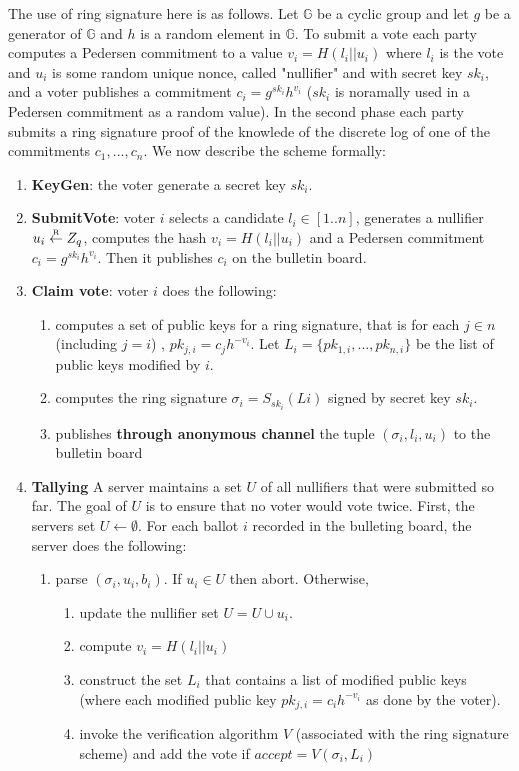 \documentclass[]{article}
\newcommand\getr{\stackrel{\mathclap{\normalfont\mbox{\tiny R}}}{\gets}}
\begin{document}
		The use of ring signature here is as follows. Let $\mathbb{G}$ 
		be a cyclic group and let $g$ be a generator of $\mathbb{G}$ and $h$ is a random element in $\mathbb{G}$. 
		To submit a vote each party computes a Pedersen commitment to a value $v_i = H(l_i||u_i)$ where $l_i$ is the vote and $u_i$ is some random unique nonce, called "nullifier" and with secret key $sk_i$, and a voter publishes a commitment $c_i = g^{sk_i}h^{v_i}$ ($sk_i$ is noramally used in a Pedersen commitment as a random value). In the second phase each party submits a ring signature proof of the knowlede of the discrete log of one of the commitments $c_1,...,c_n$. 	We now describe the scheme formally:
		\begin{enumerate}
			\item {\bf KeyGen}: the voter generate a secret key $sk_i$.  
			\item {\bf SubmitVote}: voter $i$ selects a candidate $l_i\in [1..n]$, generates a nullifier $u_i \getr Z_q$, computes the hash $v_i = H(l_i||u_i)$ and a Pedersen commitment $c_i = g^{sk_i}h^{v_i}$. Then it publishes $c_i$ on the bulletin board.
			\item {\bf Claim vote}: voter $i$ does the following:
			\begin{enumerate}
				\item computes a set of public keys for a ring signature, that is for each $j\in n$ (including $j=i$) , $pk_{j,i} = c_j h^{ - v_i}$. Let $L_i  = \{pk_{1,i},...,pk_{n,i}\}$ be the list of public keys modified by $i$.
				\item computes the ring signature $\sigma_i  = S_{sk_i}(Li)$ signed by secret key $sk_i$.
				\item publishes {\bf through anonymous channel} the tuple $(\sigma_i, l_i,u_i)$ to the bulletin board
			\end{enumerate}
			\item {\bf Tallying} 
			A server maintains a set $U$ of all nullifiers that were submitted so far.  The goal of $U$ is to ensure that no voter would vote twice. First, the servers set $U \gets \emptyset$.
			For each ballot $i$ recorded in the bulleting board, the server does the following:
			\begin{enumerate}
				\item parse $(\sigma_i, u_i, b_i)$. If $u_i\in U$ then abort. Otherwise, 
				\begin{enumerate}
					\item 	update the nullifier set $U = U\cup u_i$.
					\item compute $v_i = H(l_i||u_i)$
					\item construct the set $L_i$ that contains a list of modified public keys (where each modified public key  $pk_{j,i} = c_i h^{ - v_i}$  as done by the voter).
					\item invoke the verification algorithm $V$ (associated with the ring signature scheme) and add the vote if $accept = V(\sigma_i,L_i)$
				\end{enumerate}
			\end{enumerate}
		\end{enumerate}
		
\end{document}
